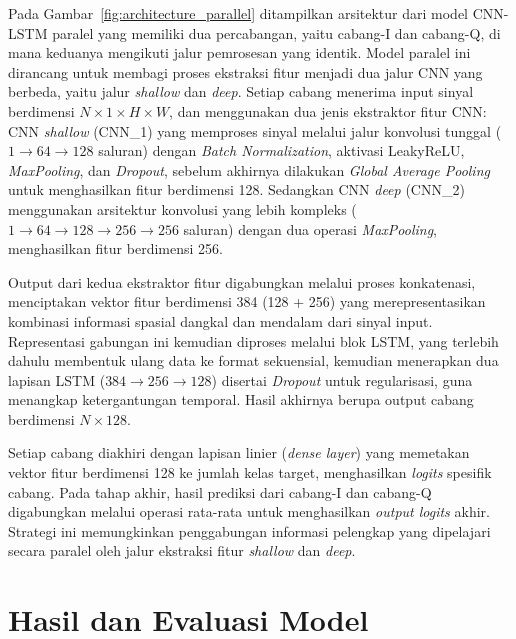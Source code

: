 \documentclass{article}
\begin{document}
\newpage
Pada Gambar~\ref{fig:architecture_parallel} ditampilkan arsitektur dari model CNN-LSTM paralel yang memiliki dua percabangan, yaitu cabang-I dan cabang-Q, di mana keduanya mengikuti jalur pemrosesan yang identik. Model paralel ini dirancang untuk membagi proses ekstraksi fitur menjadi dua jalur CNN yang berbeda, yaitu jalur \textit{shallow} dan \textit{deep}. Setiap cabang menerima input sinyal berdimensi $N \times 1 \times H \times W$, dan menggunakan dua jenis ekstraktor fitur CNN: CNN \textit{shallow} (CNN\_1) yang memproses sinyal melalui jalur konvolusi tunggal ($1 \rightarrow 64 \rightarrow 128$ saluran) dengan \textit{Batch Normalization}, aktivasi LeakyReLU, \textit{MaxPooling}, dan \textit{Dropout}, sebelum akhirnya dilakukan \textit{Global Average Pooling} untuk menghasilkan fitur berdimensi 128. Sedangkan CNN \textit{deep} (CNN\_2) menggunakan arsitektur konvolusi yang lebih kompleks ($1 \rightarrow 64 \rightarrow 128 \rightarrow 256 \rightarrow 256$ saluran) dengan dua operasi \textit{MaxPooling}, menghasilkan fitur berdimensi 256.

Output dari kedua ekstraktor fitur digabungkan melalui proses konkatenasi, menciptakan vektor fitur berdimensi 384 (128 + 256) yang merepresentasikan kombinasi informasi spasial dangkal dan mendalam dari sinyal input. Representasi gabungan ini kemudian diproses melalui blok LSTM, yang terlebih dahulu membentuk ulang data ke format sekuensial, kemudian menerapkan dua lapisan LSTM ($384 \rightarrow 256 \rightarrow 128$) disertai \textit{Dropout} untuk regularisasi, guna menangkap ketergantungan temporal. Hasil akhirnya berupa output cabang berdimensi $N \times 128$.

Setiap cabang diakhiri dengan lapisan linier (\textit{dense layer}) yang memetakan vektor fitur berdimensi 128 ke jumlah kelas target, menghasilkan \textit{logits} spesifik cabang. Pada tahap akhir, hasil prediksi dari cabang-I dan cabang-Q digabungkan melalui operasi rata-rata untuk menghasilkan \textit{output logits} akhir. Strategi ini memungkinkan penggabungan informasi pelengkap yang dipelajari secara paralel oleh jalur ekstraksi fitur \textit{shallow} dan \textit{deep}.
\section{Hasil dan Evaluasi Model}
\end{document}
